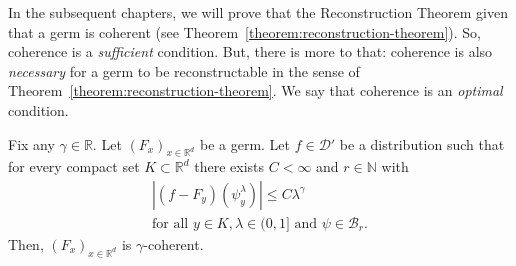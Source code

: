 In the subsequent chapters, we will prove that the Reconstruction Theorem given that a germ is coherent (see Theorem~\ref{theorem:reconstruction-theorem}). So, coherence is a \emph{sufficient} condition. But, there is more to that: coherence is also \emph{necessary} for a germ to be reconstructable in the sense of Theorem~\ref{theorem:reconstruction-theorem}. We say that coherence is an \emph{optimal} condition.

\begin{theorem}\label{theorem:coherence-is-necessary}
   Fix any \(\gamma \in \mathbb{R}\).  Let \({(F_x)}_{x \in \mathbb{R}^d}\) be a germ. Let \(f \in \mathcal{D}'\) be a distribution such that for every compact set \(K \subset \mathbb{R}^d\) there exists \(C < \infty\) and \(r \in \mathbb{N}\) with
   \begin{gather}\label{thm:coh-necessary}
        |(f-F_y)(\psi^\lambda_y)| \leq C \lambda^\gamma \\
        \text{for all \(y \in K, \lambda \in (0,1]\) and \(\psi \in \mathcal{B}_r\).} \nonumber
   \end{gather}
   Then, \({(F_x)}_{x \in \mathbb{R}^d}\) is \(\gamma\)-coherent.  
\end{theorem}

